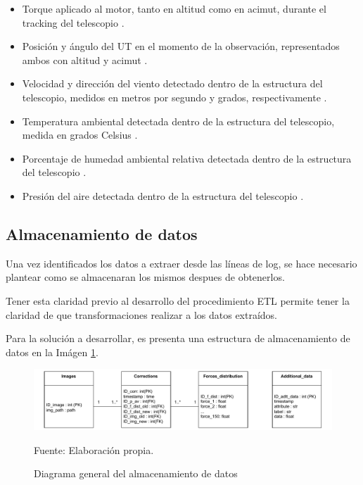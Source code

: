 \begin{itemize}
    \item Torque aplicado al motor, tanto en altitud como en acimut, durante el tracking del telescopio \cite{eso1998vlt}.

    \item Posición y ángulo del UT en el momento de la observación, representados ambos con altitud y acimut \cite{eso1998vlt}.

    \item Velocidad y dirección del viento detectado dentro de la estructura del telescopio, medidos en metros por segundo y grados, respectivamente \cite{eso1998vlt}.

    \item Temperatura ambiental detectada dentro de la estructura del telescopio, medida en grados Celsius \cite{eso1998vlt}.

    \item Porcentaje de humedad ambiental relativa detectada dentro de la estructura del telescopio \cite{eso1998vlt}.

    \item Presión del aire detectada dentro de la estructura del telescopio \cite{eso1998vlt}.    
\end{itemize}

\subsection{Almacenamiento de datos}

Una vez identificados los datos a extraer desde las líneas de log, se hace necesario plantear como se almacenaran los mismos despues de obtenerlos. 

Tener esta claridad previo al desarrollo del procedimiento ETL permite tener la claridad de que transformaciones realizar a los datos extraídos.

Para la solución a desarrollar, es presenta una estructura de almacenamiento de datos en la Imágen \ref{fig:db_general}.

\begin{figure}[h]
\centering
\includegraphics[width=16cm]{figures/db_diagram}
\caption{\label{fig:db_general} Diagrama general del almacenamiento de datos} Fuente: Elaboración propia.
\end{figure}

